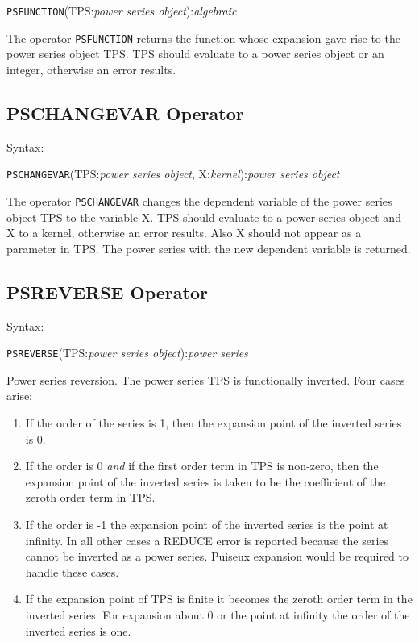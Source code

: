 \hspace*{2em}
{\tt PSFUNCTION}(TPS:{\em power series object}):{\em algebraic}

The operator {\tt PSFUNCTION} returns the function whose expansion
gave rise to the power series object TPS. TPS should
evaluate to a power series object or an integer, otherwise an error
results.

\subsection{PSCHANGEVAR Operator}

Syntax:

\hspace*{2em} {\tt PSCHANGEVAR}(TPS:{\em power series object},
X:{\em kernel}):{\em power series object}

The operator {\tt PSCHANGEVAR} changes the dependent variable of the
power series object TPS to the variable X. TPS
should evaluate to a power series object and X to a kernel,
otherwise an error results.  Also X should not appear as a
parameter in TPS. The power series with the new dependent
variable is returned.

\subsection{PSREVERSE Operator}

Syntax:

\hspace*{2em}
{\tt PSREVERSE}(TPS:{\em power series object}):{\em power series}

Power series reversion.  The power series TPS is functionally
inverted.  Four cases arise:

\begin{enumerate}
\item If the order of the series is 1, then the expansion point of the
inverted series is 0. 

\item If the order is 0 {\em and} if the first order term in TPS
is non-zero, then the expansion point of the inverted series is taken
to be the coefficient of the zeroth order term in TPS.

\item If the order is -1 the expansion point of the inverted series
is the point at infinity.  In all other cases a REDUCE error is
reported because the series cannot be inverted as a power series.
Puiseux  expansion would be required to
handle these cases. 

\item If the expansion point of TPS is finite it becomes the
zeroth order term in the inverted series. For expansion about 0 or the
point at infinity the order of the inverted series is one.
\end{enumerate}

